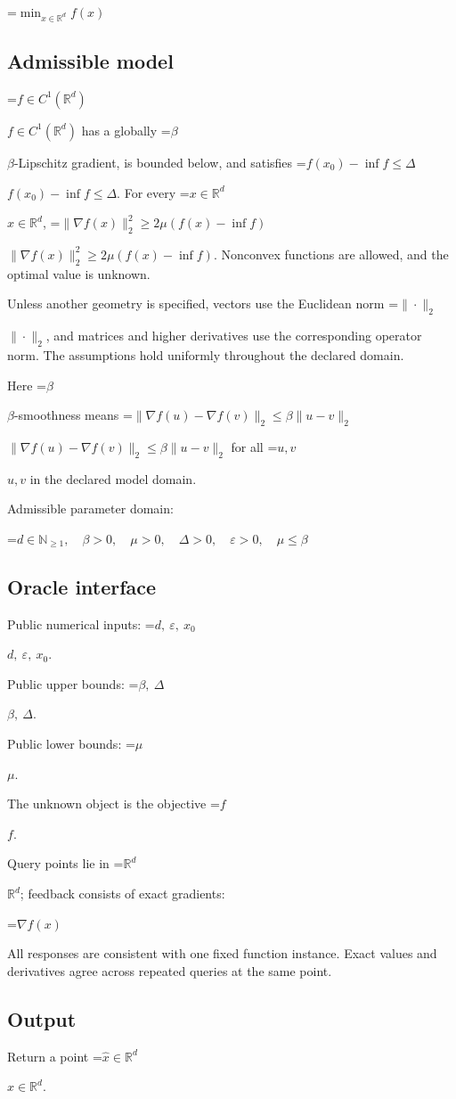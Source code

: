 \documentclass[10pt,a4paper]{article}
\newcommand{\AtlasMath}[1]{\par\begingroup\centering\setbox0=\hbox{$\displaystyle #1$}\ifdim\wd0>1.4\linewidth\typeout{ATLAS WIDE FORMULA: \the\wd0}\fi\ifdim\wd0>\linewidth\resizebox{\linewidth}{!}{\box0}\else\box0\fi\par\endgroup}
\newcommand{\AtlasInlineMath}[1]{\begingroup\setbox0=\hbox{$#1$}\ifdim\wd0>.4\linewidth\endgroup\AtlasMath{#1}\else\endgroup$#1$\fi}
\begin{document}
\AtlasMath{\min_{x\in \mathbb{R}^d}f(x)}


\subsection{Admissible model}
\AtlasInlineMath{f\in C^1(\mathbb R^d)} has a globally \AtlasInlineMath{\beta}-Lipschitz gradient, is bounded below, and satisfies \AtlasInlineMath{f(x_0)-\inf f\le\Delta}. For every \AtlasInlineMath{x\in\mathbb R^d}, \AtlasInlineMath{\|\nabla f(x)\|_2^2\ge2\mu(f(x)-\inf f)}. Nonconvex functions are allowed, and the optimal value is unknown.

Unless another geometry is specified, vectors use the Euclidean norm \AtlasInlineMath{\|\cdot\|_2}, and matrices and higher derivatives use the corresponding operator norm. The assumptions hold uniformly throughout the declared domain.

Here \AtlasInlineMath{\beta}-smoothness means \AtlasInlineMath{\|\nabla f(u)-\nabla f(v)\|_2\le\beta\|u-v\|_2} for all \AtlasInlineMath{u,v} in the declared model domain.

Admissible parameter domain:


\AtlasMath{d\in\mathbb{N}_{\ge1},\quad \beta>0,\quad \mu>0,\quad \Delta>0,\quad \varepsilon>0,\quad \mu\le\beta}


\subsection{Oracle interface}
Public numerical inputs: \AtlasInlineMath{d,\ \varepsilon,\ x_0}.

Public upper bounds: \AtlasInlineMath{\beta,\ \Delta}.

Public lower bounds: \AtlasInlineMath{\mu}.

The unknown object is the objective \AtlasInlineMath{f}.

Query points lie in \AtlasInlineMath{\mathbb{R}^d}; feedback consists of exact gradients:


\AtlasMath{\nabla f(x)}


All responses are consistent with one fixed function instance. Exact values and derivatives agree across repeated queries at the same point.

\subsection{Output}
Return a point \AtlasInlineMath{\widehat x\in\mathbb R^d}.
\end{document}
